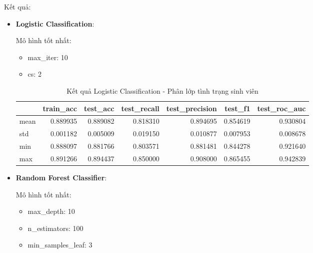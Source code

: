     Kết quả:
    \begin{itemize}
        \item \textbf{Logistic Classification}: 
        
            Mô hình tốt nhất:
            \begin{itemize}
                \item max\_iter: 10
                \item cs: 2
            \end{itemize}

            \begin{table}[htbp]
            \centering
            \caption{Kết quả Logistic Classification - Phân lớp tình trạng sinh viên}
            \label{tab:LogCV-Dropout}
            \begin{tabular}{lrrrrrr}
                \hline
                & train\_acc & test\_acc & test\_recall & test\_precision & test\_f1 & test\_roc\_auc \\
                \hline
                mean & 0.889935 & 0.889082 & 0.818310 & 0.894695 & 0.854619 & 0.930804 \\
                std & 0.001182 & 0.005009 & 0.019150 & 0.010877 & 0.007953 & 0.008678 \\
                min & 0.888097 & 0.881766 & 0.803571 & 0.881481 & 0.844278 & 0.921640 \\
                max & 0.891266 & 0.894437 & 0.850000 & 0.908000 & 0.865455 & 0.942839 \\
                \hline
            \end{tabular}
            \end{table}
  
            
            \FloatBarrier

        \item \textbf{Random Forest Classifier}:

            Mô hình tốt nhất:
            \begin{itemize}
                \item max\_depth: 10
                \item n\_estimators: 100
                \item min\_samples\_leaf: 3
            \end{itemize}


\end{itemize}
